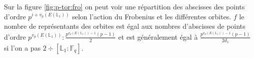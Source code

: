 \documentclass[10pt,a4paper]{book}
\theoremstyle{plain}
\theoremstyle{definition}
\theoremstyle{definition}
\theoremstyle{definition}
\theoremstyle{definition}
\theoremstyle{remark}
\theoremstyle{remark}
\theoremstyle{definition}
\begin{document}

Sur la figure \ref{fig:p-tor:fro} on peut voir une répartition des abscisses des points d'ordre $p^{i+v_p(E(\mathbb{L}_1))}$ selon l'action du Frobenius et les différentes orbites. $f$ le nombre de représentants des orbites est égal aux nombres d'abscisses de points d'ordre $p^{v_p(E(\mathbb{L}_1))}:\frac{p^{v_p(E(\mathbb{L}_1))-1}(p-1)}{2}$ et est généralement égal à $\frac{p^{v_p(E(\mathbb{L}_1))-1}(p-1)}{2d_1}$ si l'on a pas $2 \div [\mathbb{L}_1:\mathbb{F}_q]$.
\end{document}
